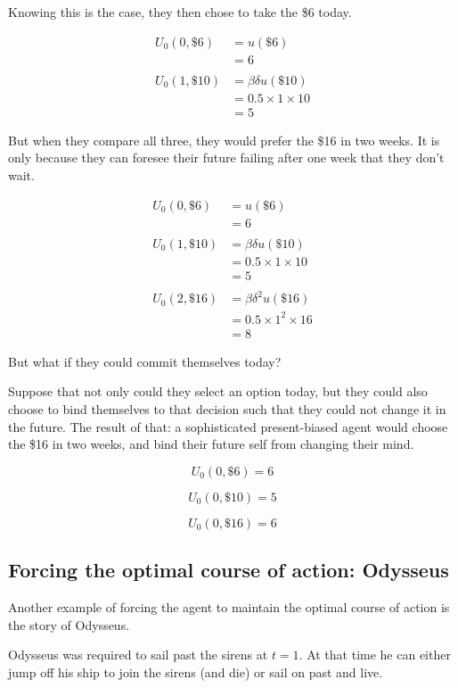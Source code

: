 \documentclass[
  letterpaper,
  DIV=11,
  numbers=noendperiod]{scrreprt}
\begin{document}
Knowing this is the case, they then chose to take the \$6 today.

\begin{align*}
U_0(0,\$6)&=u(\$6) \\
&=6 \\
\\
U_0(1,\$10)&=\beta\delta u(\$10) \\
&=0.5\times 1\times 10 \\
&=5
\end{align*}

But when they compare all three, they would prefer the \$16 in two
weeks. It is only because they can foresee their future failing after
one week that they don't wait.

\begin{align*}
U_0(0,\$6)&=u(\$6) \\
&=6 \\
\\
U_0(1,\$10)&=\beta\delta u(\$10) \\
&=0.5\times 1\times 10 \\
&=5 \\
\\
U_0(2,\$16)&=\beta\delta^2 u(\$16) \\
&=0.5\times 1^2\times 16 \\
&=8
\end{align*}

But what if they could commit themselves today?

Suppose that not only could they select an option today, but they could
also choose to bind themselves to that decision such that they could not
change it in the future. The result of that: a sophisticated
present-biased agent would choose the \$16 in two weeks, and bind their
future self from changing their mind.

\[
U_0(0,\$6)=6
\]

\[
U_0(0,\$10)=5
\]

\[
U_0(0,\$16)=6
\]

\hypertarget{forcing-the-optimal-course-of-action-odysseus}{%
\subsection{Forcing the optimal course of action:
Odysseus}\label{forcing-the-optimal-course-of-action-odysseus}}

Another example of forcing the agent to maintain the optimal course of
action is the story of Odysseus.

Odysseus was required to sail past the sirens at \(t=1\). At that time
he can either jump off his ship to join the sirens (and die) or sail on
past and live.
\end{document}
